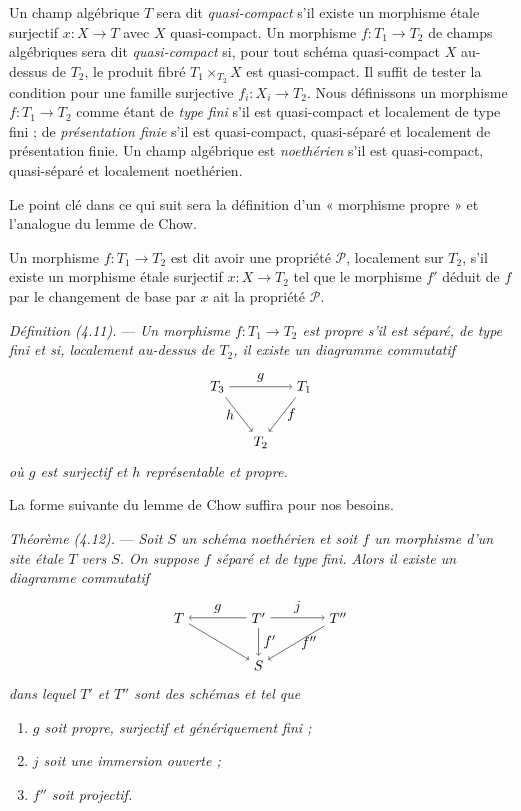 \documentclass[10pt]{article}
\begin{document}
Un champ algébrique $T$ sera dit \emph{quasi-compact} s'il existe un morphisme étale surjectif $x:X\to T$ avec $X$ quasi-compact. Un morphisme $f:T_1\to T_2$ de champs algébriques sera dit \emph{quasi-compact} si, pour tout schéma quasi-compact $X$ au-dessus de $T_2$, le produit fibré $T_1\times_{T_2}X$ est quasi-compact. Il suffit de tester la condition pour une famille surjective $f_i:X_i\to T_2$. Nous définissons un morphisme $f:T_1\to T_2$ comme étant de \emph{type fini} s'il est quasi-compact et localement de type fini ; de \emph{présentation finie} s'il est quasi-compact, quasi-séparé et localement de présentation finie. Un champ algébrique est \emph{noethérien} s'il est quasi-compact, quasi-séparé et localement noethérien.

Le point clé dans ce qui suit sera la définition d'un « morphisme propre » et l'analogue du lemme de Chow.

Un morphisme $f:T_1\to T_2$ est dit avoir une propriété $\mathcal P$, localement sur $T_2$, s'il existe un morphisme étale surjectif $x:X\to T_2$ tel que le morphisme $f'$ déduit de $f$ par le changement de base par $x$ ait la propriété $\mathcal P$.

\medskip
\noindent\emph{Définition (4.11).} --- \emph{Un morphisme $f:T_1\to T_2$ est propre s'il est séparé, de type fini et si, localement au-dessus de $T_2$, il existe un diagramme commutatif}
\[
\begin{tikzpicture}[baseline=(current bounding box.center)]
\node (T3) at (0,1.4) {$T_3$};
\node (T1) at (2.2,1.4) {$T_1$};
\node (T2) at (1.1,0) {$T_2$};
\draw[->] (T3) -- node[above] {$g$} (T1);
\draw[->] (T1) -- node[right] {$f$} (T2);
\draw[->] (T3) -- node[left] {$h$} (T2);
\end{tikzpicture}
\]
\emph{où $g$ est surjectif et $h$ représentable et propre.}

La forme suivante du lemme de Chow suffira pour nos besoins.

\medskip
\noindent\emph{Théorème (4.12).} --- \emph{Soit $S$ un schéma noethérien et soit $f$ un morphisme d'un site étale $T$ vers $S$. On suppose $f$ séparé et de type fini. Alors il existe un diagramme commutatif}
\[
\begin{tikzpicture}[baseline=(current bounding box.center)]
\node (T) at (0,1.2) {$T$};
\node (Tp) at (2.0,1.2) {$T'$};
\node (Tpp) at (4.0,1.2) {$T''$};
\node (S) at (2.0,0) {$S$};
\draw[->] (Tp) -- node[above] {$g$} (T);
\draw[->] (Tp) -- node[above] {$j$} (Tpp);
\draw[->] (T) -- (S);
\draw[->] (Tp) -- node[right] {$f'$} (S);
\draw[->] (Tpp) -- node[right] {$f''$} (S);
\end{tikzpicture}
\]
\emph{dans lequel $T'$ et $T''$ sont des schémas et tel que}
\begin{enumerate}[label=(\roman*)]
\item \emph{$g$ soit propre, surjectif et génériquement fini ;}
\item \emph{$j$ soit une immersion ouverte ;}
\item \emph{$f''$ soit projectif.}
\end{enumerate}
\end{document}
